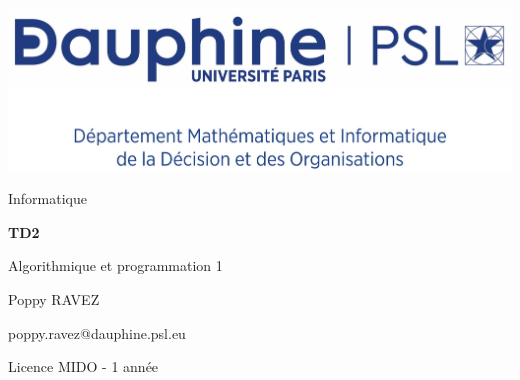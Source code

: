 \documentclass{report}
\author{Prénom NOM}
\begin{document}
\centering
\includegraphics[scale=0.08]{../../logo/pdf/MIDO_centre}


\sffamily
\vspace{6cm}
\LARGE
\mdseries
Informatique

\huge
\bfseries
TD2

Algorithmique et programmation 1

\vspace{3cm}
\rmfamily

\mdseries
\makeatletter
\large
Poppy RAVEZ

\vspace{0.2cm}
\normalsize
poppy.ravez@dauphine.psl.eu

\vspace{0.2cm}
Licence MIDO - 1\iere{} année

\vspace{5cm}
\@date
\makeatother
\end{document}
